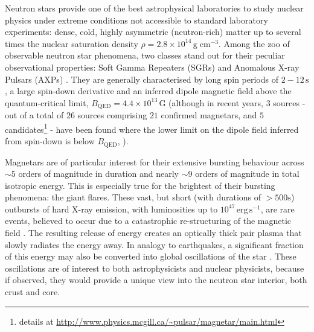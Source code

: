 \documentclass[numberedappendix]{emulateapj}
\begin{document}
Neutron stars provide one of the best astrophysical laboratories to study nuclear physics under extreme conditions not accessible to standard laboratory experiments: dense, cold, highly asymmetric (neutron-rich) matter up to several times the nuclear saturation density $\rho = 2.8\times10^{14} \, \mathrm{g}\; \mathrm{cm}^{-3}$.
Among the zoo of observable neutron star phenomena, two classes stand out for their peculiar observational properties: Soft Gamma Repeaters (SGRs) and Anomalous X-ray Pulsars (AXPs) \citep[both classes are  \textit{magnetars}; for a general overview, see ][]{woods2006,mereghetti2011}.
They are generally characterised by long spin periods of $2 - 12 \, \mathrm{s}$, a large spin-down derivative and an inferred dipole magnetic field above the quantum-critical limit, $B_{\mathrm{QED}} = 4.4 \times 10^{13} \, \mathrm{G}$ (although in recent years, $3$ sources - out of a total of $26$ sources comprising $21$ confirmed magnetars, and $5$ candidates\footnote{details at \url{http://www.physics.mcgill.ca/~pulsar/magnetar/main.html}} - have been found where the lower limit on the dipole field inferred from spin-down is below $B_{\mathrm{QED}}$,  \citet{vanderhorst2010,esposito2010,rea2010,rea2012,scholz2012,rea2014}). 

Magnetars are of particular interest for their extensive bursting behaviour across $\sim\!\! 5$ orders of magnitude in duration and nearly $\sim\!\! 9$ orders of magnitude in total isotropic energy. This is especially true for the brightest of their bursting phenomena: the giant flares. These vast, but short (with durations of $>\! 500\mathrm{s}$) outbursts of hard X-ray emission, with luminosities up to $10^{47}\,\mathrm{erg}\, \mathrm{s}^{-1}$, are rare events, believed to occur due to a catastrophic re-structuring of the magnetic field \citep{thompson1995,lyutikov2003}.  The resulting release of energy creates an optically thick pair plasma that slowly radiates the energy away. In analogy to earthquakes, a significant fraction of this energy may also be converted into global oscillations of the star \citep{duncan1998}. These oscillations are of interest to both astrophysicists and nuclear physicists, because if observed, they would provide a unique view into the neutron star interior, both crust and core. 
\end{document}
